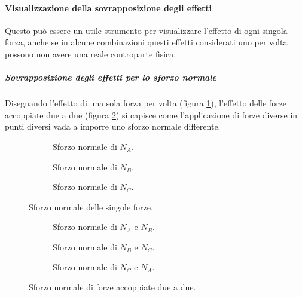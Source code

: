 \documentclass[main.tex]{subfiles}
\begin{document}
\paragraph{Visualizzazione della sovrapposizione degli effetti}
Questo può essere un utile strumento per visualizzare l'effetto di ogni singola forza, anche se in alcune combinazioni questi effetti considerati uno per volta possono non avere una reale controparte fisica.

\subparagraph{Sovrapposizione degli effetti per lo sforzo normale}
Disegnando l'effetto di una sola forza per volta (figura \ref{sforzo_forza_singola}), l'effetto delle forze accoppiate due a due  (figura \ref{sforzo_coppia_forze}) si capisce come l'applicazione di forze diverse in punti diversi vada a imporre uno sforzo normale differente.

\begin{figure}[!tbp]
  \begin{subfigure}[b]{.3\textwidth}
  \centering
  \resizebox{.5\textwidth}{!}{}
  \caption{Sforzo normale di $N_A$.}
  \end{subfigure}
  \hfill
  \begin{subfigure}[b]{.3\textwidth}
  \centering
  \resizebox{.5\textwidth}{!}{}
  \caption{Sforzo normale di $N_B$.}
  \end{subfigure}
  \hfill
  \begin{subfigure}[b]{.3\textwidth}
  \centering
  \resizebox{.5\textwidth}{!}{}
  \caption{Sforzo normale di $N_C$.}
  \end{subfigure}
  \caption{Sforzo normale delle singole forze.}
  \label{sforzo_forza_singola}
\end{figure}

\begin{figure}[!tbp]
  \begin{subfigure}[b]{.3\textwidth}
  \centering
  \resizebox{.5\textwidth}{!}{}
  \caption{Sforzo normale di $N_A$ e $N_B$.}
  \end{subfigure}
  \hfill
  \begin{subfigure}[b]{.3\textwidth}
  \centering
  \resizebox{.5\textwidth}{!}{}
  \caption{Sforzo normale di $N_B$ e $N_C$.}
  \end{subfigure}
  \hfill
  \begin{subfigure}[b]{.3\textwidth}
  \centering
  \resizebox{.5\textwidth}{!}{}
  \caption{Sforzo normale di $N_C$ e $N_A$.}
  \end{subfigure}
  \caption{Sforzo normale di forze accoppiate due a due.}
  \label{sforzo_coppia_forze}
\end{figure}
\end{document}
